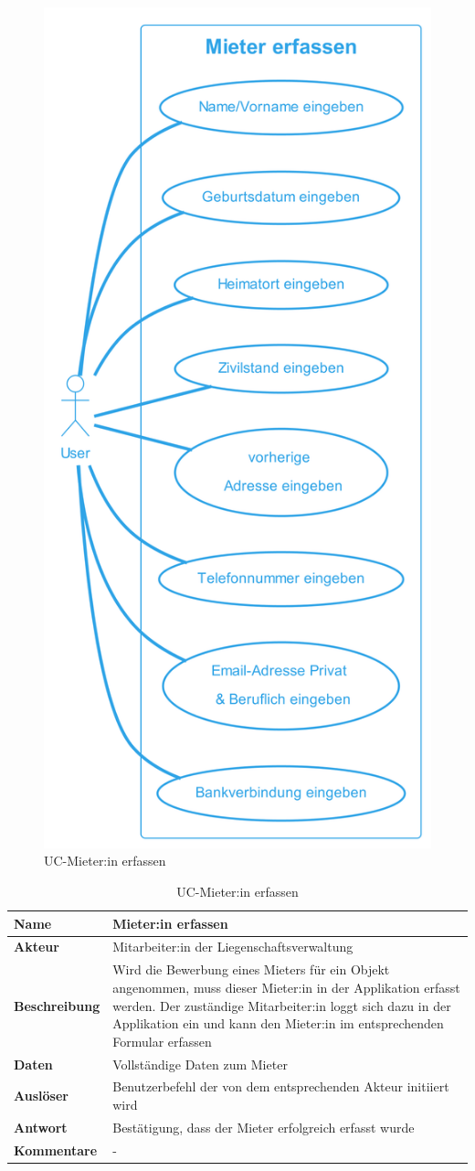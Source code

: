 \begin{figure}[H]
  \begin{center}
    \includegraphics[width=0.4\linewidth]{content/diagrams/out/usecase/mieterErfassen/Mieter erfassen.png}
    \caption{UC-Mieter:in erfassen}
    \label{mieterErfassen}
  \end{center}
\end{figure}

\begin{table}[H]
  \centering
  \settowidth{}
  \setlength\extrarowheight{2pt}
  \begin{tabulary}{1.0\textwidth}{|a|m{14cm}|}
    \hline
    \textbf{Name}& Mieter:in erfassen\\
    \hline
    \textbf{Akteur}& Mitarbeiter:in der Liegenschaftsverwaltung\\
    \hline 
    \textbf{Beschreibung} & Wird die Bewerbung eines Mieters für ein Objekt angenommen, muss dieser Mieter:in in der Applikation erfasst werden. Der zuständige Mitarbeiter:in loggt sich dazu in der Applikation ein und kann den Mieter:in im entsprechenden Formular erfassen\\
    \hline
    \textbf{Daten} & Vollständige Daten zum Mieter\\
    \hline
    \textbf{Auslöser} & Benutzerbefehl der von dem entsprechenden Akteur initiiert wird\\
    \hline
    \textbf{Antwort} & Bestätigung, dass der Mieter erfolgreich erfasst wurde\\
    \hline
    \textbf{Kommentare} & -\\
    \hline
  \end{tabulary}
  \caption{UC-Mieter:in erfassen}
\end{table}

